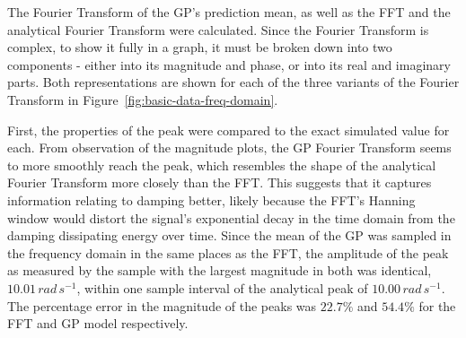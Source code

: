 \documentclass[12pt]{article}
\begin{document}
    The Fourier Transform of the GP's prediction mean, as well as the FFT and the analytical Fourier Transform were calculated.
    Since the Fourier Transform is complex, to show it fully in a graph, it must be broken down into two components - either into its magnitude and phase, or into its real and imaginary parts.
    Both representations are shown for each of the three variants of the Fourier Transform in Figure~\ref{fig:basic-data-freq-domain}.

    First, the properties of the peak were compared to the exact simulated value for each.
    From observation of the magnitude plots, the GP Fourier Transform seems to more smoothly reach the peak, which resembles the shape of the analytical Fourier Transform more closely than the FFT.
    This suggests that it captures information relating to damping better, likely because the FFT's Hanning window would distort the signal's exponential decay in the time domain from the damping dissipating energy over time.
    Since the mean of the GP was sampled in the frequency domain in the same places as the FFT, the amplitude of the peak as measured by the sample with the largest magnitude in both was identical, $10.01 \, rad \, s^{-1}$, within one sample interval of the analytical peak of $10.00 \, rad \, s^{-1}$.
    The percentage error in the magnitude of the peaks was $22.7\%$ and $54.4\%$ for the FFT and GP model respectively.
\end{document}
